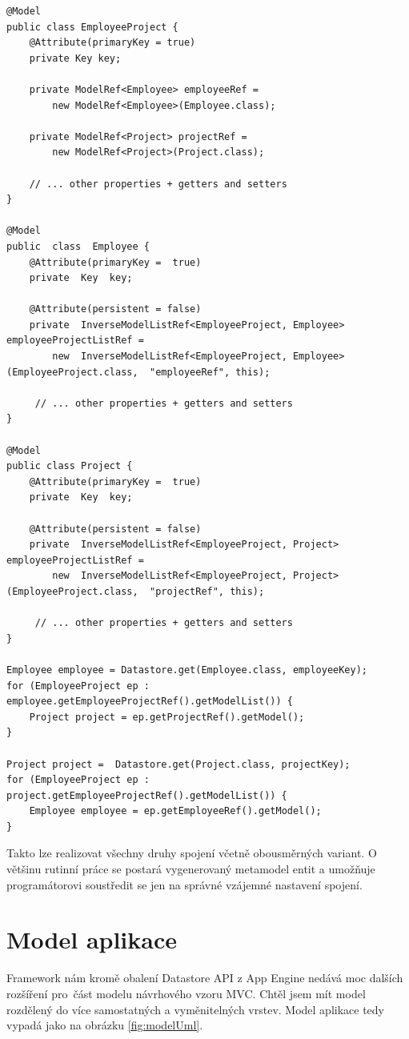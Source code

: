 \begin{lstlisting}[caption={Ukázka many-to-many vztahu s použitím spojovací entitní třídy},label=lst:manyToManyJoinTable,belowcaptionskip=0.4cm]
@Model
public class EmployeeProject {
	@Attribute(primaryKey = true)
	private Key key;

	private ModelRef<Employee> employeeRef = 
		new ModelRef<Employee>(Employee.class);

	private ModelRef<Project> projectRef = 
		new ModelRef<Project>(Project.class);

	// ... other properties + getters and setters
}

@Model
public  class  Employee {
	@Attribute(primaryKey =  true)
	private  Key  key;

	@Attribute(persistent = false)
	private  InverseModelListRef<EmployeeProject, Employee>  employeeProjectListRef =
		new  InverseModelListRef<EmployeeProject, Employee>(EmployeeProject.class,  "employeeRef", this);

     // ... other properties + getters and setters
}

@Model
public class Project {
	@Attribute(primaryKey =  true)
	private  Key  key;

	@Attribute(persistent = false)
	private  InverseModelListRef<EmployeeProject, Project>  employeeProjectListRef =
		new  InverseModelListRef<EmployeeProject, Project>(EmployeeProject.class,  "projectRef", this);

     // ... other properties + getters and setters
}

Employee employee = Datastore.get(Employee.class, employeeKey);
for (EmployeeProject ep : employee.getEmployeeProjectRef().getModelList()) {
	Project project = ep.getProjectRef().getModel();
}

Project project =  Datastore.get(Project.class, projectKey);
for (EmployeeProject ep : project.getEmployeeProjectRef().getModelList()) {
	Employee employee = ep.getEmployeeRef().getModel();
}
\end{lstlisting}

Takto lze realizovat všechny druhy spojení včetně obousměrných variant. O většinu rutinní práce se postará vygenerovaný metamodel entit a umožňuje programátorovi soustředit se jen na správné vzájemné nastavení spojení.

\section{Model aplikace}
Framework nám kromě obalení Datastore API z App Engine nedává moc dalších rozšíření pro~část modelu návrhového vzoru MVC. Chtěl jsem mít model rozdělený do více samostatných a vyměnitelných vrstev. Model aplikace tedy vypadá jako na obrázku \ref{fig:modelUml}.

